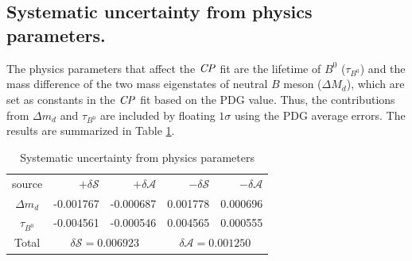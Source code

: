 \subsection{Systematic uncertainty from physics parameters.}
The physics parameters that affect the $\it{CP}$ fit are the lifetime of $B^0$ ($\tau_{B^0}$) and the mass difference of the two mass eigenstates of neutral $B$ meson ($\Delta M_d$), which are set as constants in the $\it{CP}$ fit based on the PDG value.
Thus, the contributions from $\Delta m_d$ and $\tau_{B^0}$ are included by floating $1\sigma$ using the PDG average errors. The results are summarized in Table \ref{tab:sy_phys}.
\begin{table}[htpb]
	\begin{minipage}[b]{1.0\linewidth}
		\centering
		\caption{Systematic uncertainty from  physics parameters}
		\label{tab:sy_phys}
		\begin{tabular}{c r r r r}
			\hline
			source & $+\delta \mathcal{S}$ & $+\delta \mathcal{A}$ & $-\delta \mathcal{S}$ &  $-\delta \mathcal{A}$\\
			$\Delta m_d$  & -0.001767
			& -0.000687
			& 0.001778
			& 0.000696
			\\
			$\tau_{B^0}$  & -0.004561
			& -0.000546
			& 0.004565
			& 0.000555
			\\
			\hline
			Total &
			\multicolumn{2}{c}{$\delta \mathcal{S}=0.006923$} &
			\multicolumn{2}{c}{$\delta \mathcal{A}=0.001250$}\\
			\hline
		\end{tabular}
	\end{minipage}
\end{table}


